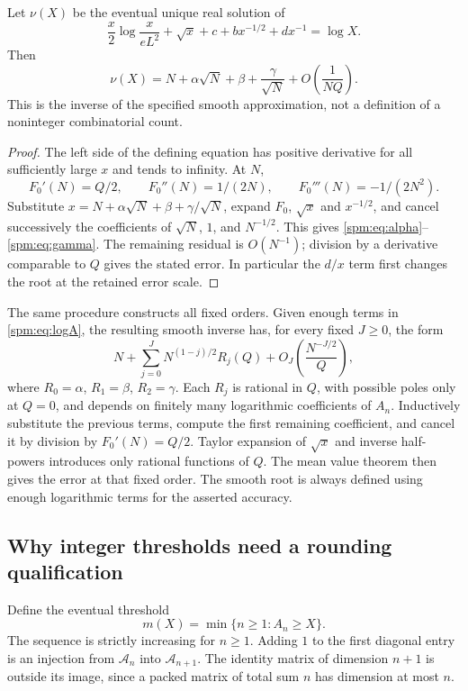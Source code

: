 \begin{proposition}\label{spm:prop:inverse}
Let $\nu(X)$ be the eventual unique real solution of
\[
 \frac x2\log\frac{x}{eL^2}+\sqrt x+c+bx^{-1/2}+dx^{-1}=\log X.
\]
Then
\begin{equation}\label{spm:eq:inverse}
 \nu(X)=N+\alpha\sqrt N+\beta+\frac\gamma{\sqrt N}
                     +O\left(\frac1{NQ}\right).
\end{equation}
This is the inverse of the specified smooth approximation, not a definition of a noninteger combinatorial count.
\end{proposition}
\begin{proof}
The left side of the defining equation has positive derivative for all sufficiently large $x$ and tends to infinity. At $N$,
\[
 F_0'(N)=Q/2,\qquad F_0''(N)=1/(2N),\qquad
 F_0'''(N)=-1/(2N^2).
\]
Substitute $x=N+\alpha\sqrt N+\beta+\gamma/\sqrt N$, expand $F_0$, $\sqrt x$ and $x^{-1/2}$, and cancel successively the coefficients of $\sqrt N$, $1$, and $N^{-1/2}$. This gives \eqref{spm:eq:alpha}--\eqref{spm:eq:gamma}. The remaining residual is $O(N^{-1})$; division by a derivative comparable to $Q$ gives the stated error. In particular the $d/x$ term first changes the root at the retained error scale.
\end{proof}

The same procedure constructs all fixed orders. Given enough terms in \eqref{spm:eq:logA}, the resulting smooth inverse has, for every fixed $J\geq0$, the form
\begin{equation}\label{spm:eq:inverseall}
 N+\sum_{j=0}^J N^{(1-j)/2}R_j(Q)
       +O_J\left(\frac{N^{-J/2}}{Q}\right),
\end{equation}
where $R_0=\alpha$, $R_1=\beta$, $R_2=\gamma$. Each $R_j$ is rational in $Q$, with possible poles only at $Q=0$, and depends on finitely many logarithmic coefficients of $A_n$. Inductively substitute the previous terms, compute the first remaining coefficient, and cancel it by division by $F_0'(N)=Q/2$. Taylor expansion of $\sqrt x$ and inverse half-powers introduces only rational functions of $Q$. The mean value theorem then gives the error at that fixed order. The smooth root is always defined using enough logarithmic terms for the asserted accuracy.

\subsection{Why integer thresholds need a rounding qualification}
Define the eventual threshold
\[
 m(X)=\min\{n\geq1:A_n\geq X\}.
\]
The sequence is strictly increasing for $n\geq1$. Adding $1$ to the first diagonal entry is an injection from $\mathcal A_n$ into $\mathcal A_{n+1}$. The identity matrix of dimension $n+1$ is outside its image, since a packed matrix of total sum $n$ has dimension at most $n$.

